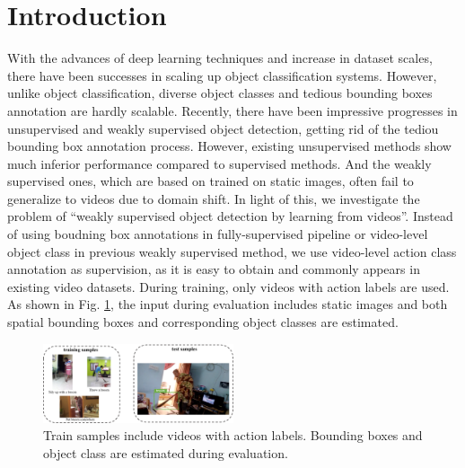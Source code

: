 \section{Introduction}
\label{sec:intro}

With the advances of deep learning techniques and increase in dataset scales, there have been successes in scaling up object classification systems. However, unlike object classification, diverse object classes and tedious bounding boxes annotation are hardly scalable. Recently, there have been impressive progresses in unsupervised and weakly supervised object detection, getting rid of the tediou bounding box annotation process. However, existing unsupervised methods show much inferior performance compared to supervised methods. And the weakly supervised ones, which are based on trained on static images, often fail to generalize to videos due to domain shift. In light of this, we investigate the problem of ``weakly supervised object detection by learning from videos''. Instead of using boudning box annotations in fully-supervised pipeline or video-level object class in previous weakly supervised method, we use video-level action class annotation as supervision, as it is easy to obtain and commonly appears in existing video datasets. During training, only videos with action labels are used. As shown in Fig. \ref{fig:train_samples}, the input during evaluation includes static images and both spatial bounding boxes and corresponding object classes are estimated.

\begin{figure}
\includegraphics[width=0.5\textwidth]{figures/training_test_samples.pdf}
\caption{Train samples include videos with action labels. Bounding boxes and object class are estimated during evaluation.}
\label{fig:train_samples}
\end{figure}


